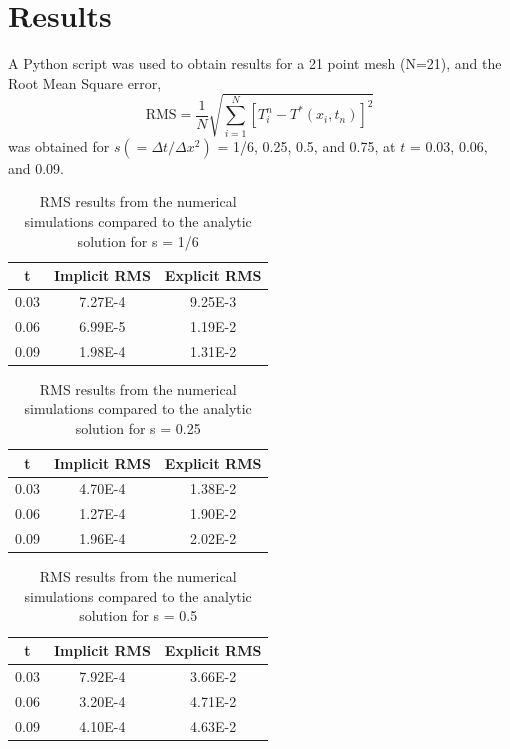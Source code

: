 \documentclass[twocolumn,10pt]{asme2ej}
\begin{document}
\section{Results}

A Python script was used to obtain results for a 21 point mesh (N=21), and the Root Mean Square error,
\begin{equation}
\mbox{RMS} = \frac{1}{N}\sqrt{\sum\limits_{i=1}^N[T_i^n - T^*(x_i, t_n)]^2}
\end{equation}
was obtained for $s(=\Delta t/ \Delta x^2)$ = 1/6, 0.25, 0.5, and 0.75, at $t$ = 0.03, 0.06, and 0.09.

\begin{table}[h]
\begin{center}
\label{table_ASME}
\begin{tabular}{|c | c c|}
\hline
t & Implicit RMS & Explicit RMS \\
\hline
0.03 & 7.27E-4 & 9.25E-3\\
0.06 & 6.99E-5 & 1.19E-2\\
0.09 & 1.98E-4 & 1.31E-2\\
\hline
\end{tabular}
\caption{RMS results from the numerical simulations compared to the analytic solution for s = 1/6}
\end{center}
\end{table}

\begin{table}[h]
\begin{center}
\label{table_ASME}
\begin{tabular}{|c | c c|}
\hline
t & Implicit RMS & Explicit RMS \\
\hline
0.03 & 4.70E-4 & 1.38E-2\\
0.06 & 1.27E-4 & 1.90E-2\\
0.09 & 1.96E-4 & 2.02E-2\\
\hline
\end{tabular}
\caption{RMS results from the numerical simulations compared to the analytic solution for s = 0.25}
\end{center}
\end{table}

\begin{table}[h]
\begin{center}
\label{table_ASME}
\begin{tabular}{|c | c c|}
\hline
t & Implicit RMS & Explicit RMS \\
\hline
0.03 & 7.92E-4 & 3.66E-2\\
0.06 & 3.20E-4 & 4.71E-2\\
0.09 & 4.10E-4 & 4.63E-2\\
\hline
\end{tabular}
\caption{RMS results from the numerical simulations compared to the analytic solution for s = 0.5}
\end{center}
\end{table}
\end{document}
